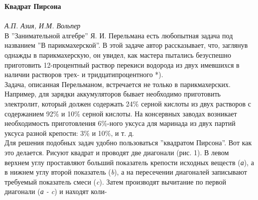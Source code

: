 \hfill
\setlength\parindent{5em}
\begin{minipage}{0.42\textwidth}
	
	\vspace{4em}
	{\LARGE \textbf{Квадрат Пирсона}}\\
	\vspace{1em}\\
	\textit{А.П. Азия, И.М. Вольпер}
	\vspace{5em}\\
В ''Занимательной алгебре'' Я. И. Перельмана есть любопытная задача под названием ''В парикмахерской''. В этой задаче автор рассказывает, что, заглянув однажды в парикмахерскую, он увидел, как мастера пытались безуспешно приготовить 12-процентный раствор перекиси водорода из двух имевшихся в наличии растворов \textemdash  трех- и тридцатипроцентного *).
\let\thefootnote\relax{} 
\\ \hspace*{\parindent} Задача, описанная Перельманом, встречается не только в парикмахерских.
\\ \hspace*{\parindent} Например, для зарядки аккумуляторов бывает необходимо приготовить электролит, который должен содержать 24\% серной кислоты из двух растворов с содержанием 92\% и 10\% серной кислоты. На консервных заводах возникает необходимость приготовления 6\%-ного уксуса для маринада из двух партий уксуса разной крепости: 3\% и 10\%, и т. д.
\\ \hspace*{\parindent} Для решения подобных задач удобно пользоваться ''квадратом Пирсона''. Вот как это делается. Рисуют квадрат и проводят две диагонали (рис. 1). В левом верхнем углу проставляют больший показатель крепости исходных веществ (\textit{а}), а в нижнем углу второй показатель (\textit{b}), а на пересечении диагоналей записывают требуемый показатель смеси (\textit{c}). Затем производят вычитание по первой диагонали (\textit{а - c}) и находят коли- 

\end{minipage}
\hfill
